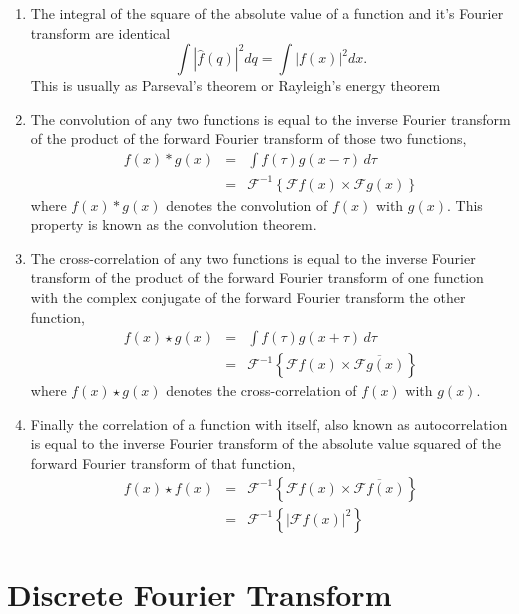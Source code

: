 \begin{enumerate}
\item The integral of the square of the absolute value of a function and it's Fourier transform are identical
\begin{equation}
\int |\hat{f}(q)|^2 dq = \int |f(x)|^2 dx.
\end{equation}
This is usually as Parseval's theorem or Rayleigh's energy theorem

\item The convolution of any two functions is equal to the inverse Fourier transform of the product of the forward Fourier transform of those two functions,
\begin{eqnarray}
f(x) * g(x) & = & \int f(\tau) g(x-\tau) \, d\tau \nonumber \\
& = & \mathscr{F}^{-1}\left\{\mathscr{F}f(x) \times \mathscr{F}g(x)\right\}
\end{eqnarray}
where $f(x) * g(x)$ denotes the convolution of $f(x)$ with $g(x)$. This property
is known as the convolution theorem.

\item The cross-correlation of any two functions is equal to the inverse Fourier
  transform of the product of the forward Fourier transform of one function with
  the complex conjugate of the forward Fourier transform the other function,
\begin{eqnarray}
f(x) \star g(x) & = & \int f(\tau) g(x+\tau) \, d\tau \nonumber \\ 
& = & \mathscr{F}^{-1}\left\{\mathscr{F}f(x) \times \overline{\mathscr{F}g(x)}\right\}
\end{eqnarray}
where $f(x) \star g(x)$ denotes the cross-correlation of $f(x)$ with $g(x)$.
 
\item Finally the correlation of a function with itself, also known as
  autocorrelation is equal to the inverse Fourier transform of the absolute
  value squared of the forward Fourier transform of that function,
  \begin{eqnarray}
f(x) \star f(x) & = & \mathscr{F}^{-1}\left\{\mathscr{F}f(x) 
  \times \overline{\mathscr{F}f(x)}\right\} \nonumber \\
& = & \mathscr{F}^{-1}\left\{|\mathscr{F}f(x)|^2\right\}
\end{eqnarray}
\end{enumerate}

\section{Discrete Fourier Transform}

